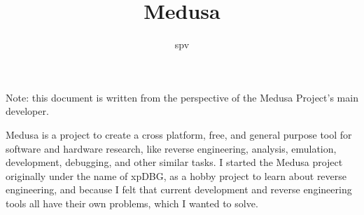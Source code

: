\documentclass{article}
\title{Medusa}
\author{spv}
\begin{document}
	\maketitle

    Note: this document is written from the perspective of the Medusa Project's
    main developer.

	Medusa is a project to create a cross platform, free, and general purpose
    tool for software and hardware research, like reverse engineering, analysis,
    emulation, development, debugging, and other similar tasks. I started the
    Medusa project originally under the name of xpDBG, as a hobby project to
    learn about reverse engineering, and because I felt that current development
    and reverse engineering tools all have their own problems, which I wanted
    to solve.
\end{document}
